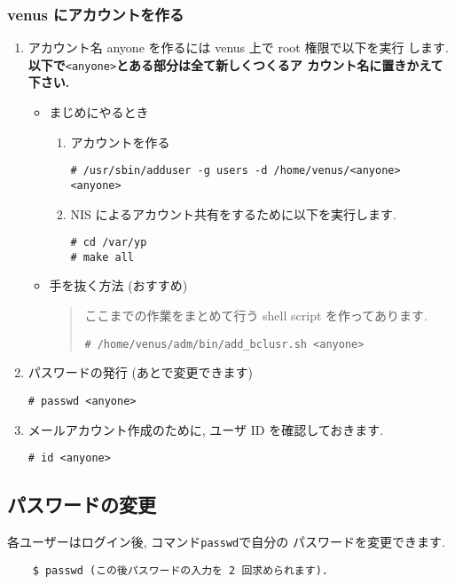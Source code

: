 \documentclass{jarticle}
\begin{document}
\subsubsection{venus にアカウントを作る}
\begin{enumerate}
\item アカウント名 anyone を作るには  venus 上で root 権限で以下を実行
  します.
  \textbf{以下で}\verb|<anyone>|\textbf{とある部分は全て新しくつくるア
    カウント名に置きかえて下さい. }
  \begin{itemize}
  \item まじめにやるとき
    \begin{enumerate}
    \item アカウントを作る
\begin{verbatim}
# /usr/sbin/adduser -g users -d /home/venus/<anyone> <anyone>
\end{verbatim}
    \item NIS によるアカウント共有をするために以下を実行します.
\begin{verbatim}
# cd /var/yp
# make all
\end{verbatim}
    \end{enumerate}

  \item 手を抜く方法 (おすすめ)
    \begin{quote}
      ここまでの作業をまとめて行う shell script を作ってあります.
\begin{verbatim}
# /home/venus/adm/bin/add_bclusr.sh <anyone>
\end{verbatim}
    \end{quote}
  \end{itemize}
\item パスワードの発行 (あとで変更できます)
\begin{verbatim}
# passwd <anyone>
\end{verbatim}
\item メールアカウント作成のために, ユーザ ID を確認しておきます.
\begin{verbatim}
# id <anyone>
\end{verbatim}
\end{enumerate}



\subsection{パスワードの変更}
各ユーザーはログイン後, コマンド\verb|passwd|で自分の
パスワードを変更できます.
\begin{verbatim}
    $ passwd (この後パスワードの入力を 2 回求められます).
\end{verbatim}
\end{document}
